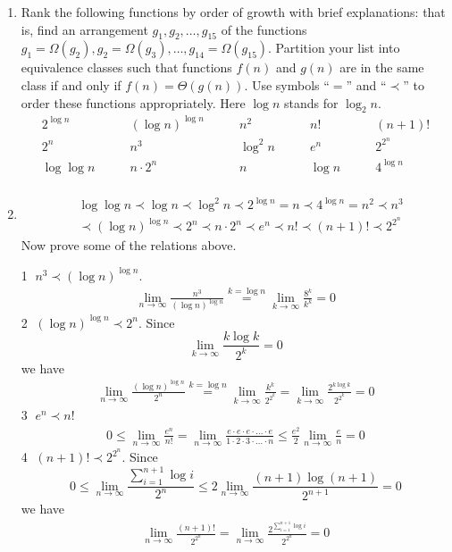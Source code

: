 \documentclass[12pt,a4paper,UTF8]{article}
\makeatletter
\newtheorem*{solution}{Solution}
\theoremstyle{definition}
\renewenvironment{solution}[1][Solution] {\par\pushQED{\qed}\normalfont\topsep6\p@\@plus6\p@\relax\trivlist\item[\hskip\labelsep\bfseries#1\@addpunct{.}]\ignorespaces}{\popQED\endtrivlist\@endpefalse} \makeatother
\makeatother
\begin{document}
\begin{enumerate}
    \item

    Rank the following functions by order of growth with brief explanations: that is, find an arrangement $g_1, g_2, \ldots , g_{15}$ of the functions $g_1 = \Omega(g_2), g_2 = \Omega(g_3), \ldots, g_{14} = \Omega(g_{15})$.  Partition your list into equivalence classes such that functions $f(n)$ and $g(n)$ are in the same class if and only if $f(n) = \Theta(g(n))$. Use symbols ``$=$'' and ``$\prec$'' to order these functions appropriately. Here $\log n$ stands for $\log_2 n$.
    $$
    \begin{array}{ccccc}
        2^{\log n} \quad & \quad (\log n)^{\log n} \quad & \quad n^2 \quad & \quad n! \quad & \quad (n + 1)! \\
        2^n \quad & \quad n^3 \quad & \quad \log^2 n \quad & \quad e^n \quad & \quad 2^{2^n} \\
        \log\log n \quad & \quad n\cdot 2^n \quad & \quad n \quad & \quad \log n \quad & \quad 4^{\log n} \\
    \end{array}
    $$

    \begin{solution}
		\begin{align*}
		&\log\log n \prec \log n \prec \log^2 n \prec 2^{\log n} = n \prec 4^{\log n} = n^2 \prec n^3\\
		&\prec (\log n)^{\log n} \prec 2^n \prec n\cdot 2^n \prec e^n \prec n! \prec (n+1)! \prec 2^{2^{n}}
		\end{align*}
		Now prove some of the relations above.
		
		\textcircled{1} $ n^3 \prec (\log n)^{\log n} $.
		\begin{align*}
		\lim\limits_{n \to \infty} \frac{n^3}{(\log n)^{\log n}} \overset{k = \log n}{=} \lim\limits_{k \to \infty} \frac{8^k}{k^k} = 0
		\end{align*}
		\textcircled{2} $ (\log n)^{\log n} \prec 2^n $. Since
		$$\lim\limits_{k \to \infty} \frac{k \log k}{2^k} = 0$$
		we have
		\begin{align*}
			\lim\limits_{n \to \infty} \frac{(\log n)^{\log n}}{2^n} \overset{k = \log n}{=} \lim\limits_{k \to \infty} \frac{k^k}{2^{2^k}} = \lim\limits_{k \to \infty} \frac{2^{k \log k}}{2^{2^k}} = 0
		\end{align*}
		\textcircled{3} $ e^n \prec n! $
		\begin{align*}
			0 \leq \lim\limits_{n \to \infty} \frac{e^n}{n!} = \lim\limits_{n \to \infty} \frac{e\cdot e\cdot e\cdot ... \cdot e}{1\cdot 2\cdot 3 \cdot ... \cdot n } \leq \frac{e^2}{2}\lim\limits_{n \to \infty}\frac{e}{n} = 0
		\end{align*}
		\textcircled{4} $ (n+1)! \prec 2^{2^{n}} $. Since
		$$0\leq \lim\limits_{n \to \infty} \frac{\sum_{i = 1}^{n+1} \log i}{2^n} \leq 2\lim\limits_{n \to \infty} \frac{(n+1)\log(n+1)}{2^{n+1}} = 0$$
		we have
		\begin{align*}
			\lim\limits_{n \to \infty} \frac{(n+1)!}{2^{2^{n}}} = \lim\limits_{n \to \infty} \frac{2^{\sum_{i = 1}^{n+1} \log i}}{2^{2^{n}}} = 0
		\end{align*}
	\end{solution}


\end{enumerate}
\end{document}
